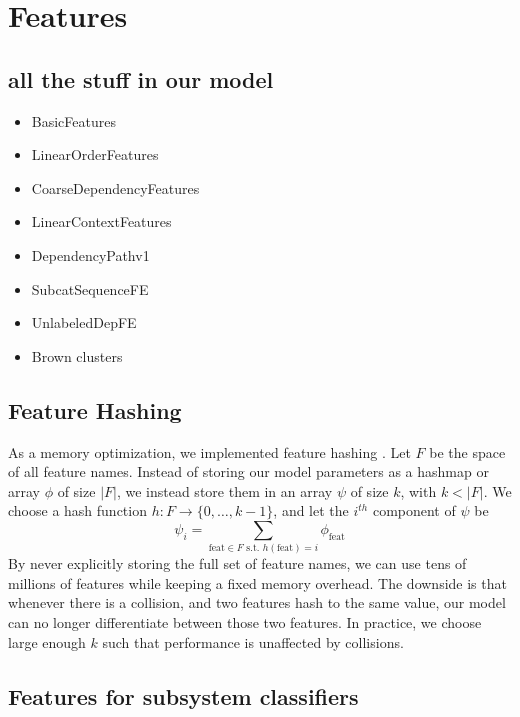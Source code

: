 \documentclass[11pt]{article}
\begin{document}
\section{Features}

\subsection{all the stuff in our model}

\label{s:features}

\begin{itemize}
\item BasicFeatures
\item LinearOrderFeatures
\item CoarseDependencyFeatures
\item LinearContextFeatures
\item DependencyPathv1
\item SubcatSequenceFE
\item UnlabeledDepFE
\item Brown clusters
\end{itemize}



\subsection{Feature Hashing}

As a memory optimization, we implemented feature hashing
\cite{weinberger_feature_2009}.
Let $F$ be the space of all feature names.
Instead of storing our model parameters as a hashmap %
or array $\phi$ of size $|F|$, we instead store them in an array $\psi$ of size
$k$, with $k < |F|$.
We choose a hash function $h : F \rightarrow \{0, \ldots, k-1\}$, and
let the $i^{th}$ component of $\psi$ be 
\[
\psi_i = \sum_{\text{feat}\in F \text{ s.t. }
h(\text{feat})=i}{\phi_{\text{feat}}}
\]
By never explicitly storing the full set of feature names, we can use
tens of millions of features while keeping a fixed memory overhead.
The downside is that whenever there is a collision, and two features hash to the
same value, our model can no longer differentiate between those two features.
In practice, we choose large enough $k$ such that performance is unaffected by
collisions.

\subsection{Features for subsystem classifiers}
\end{document}
